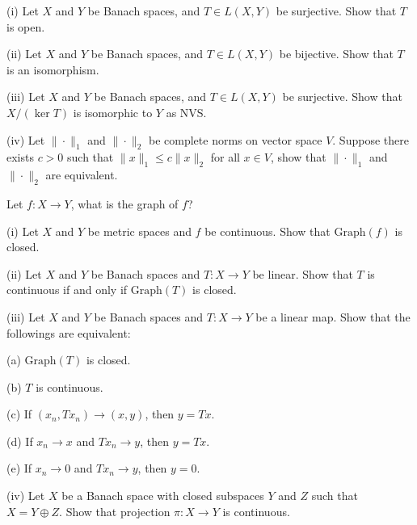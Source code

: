 \documentclass[12pt]{article}
\newcommand{\graph}{\text{Graph}}
\newenvironment{question}[2][Question]{\begin{trivlist}
\item[\hskip \labelsep {\bfseries #1}\hskip \labelsep {\bfseries #2.}]}{\end{trivlist}}
\begin{document}
\begin{question}{2.3(Open Mapping Theorem)}
	(i) Let $X$ and $Y$ be Banach spaces, and $T\in L(X,Y)$ be surjective. Show that $T$ is open.

	(ii) Let $X$ and $Y$ be Banach spaces, and $T\in L(X,Y)$ be bijective. Show that $T$ is an isomorphism.
	
	(iii) Let $X$ and $Y$ be Banach spaces, and $T \in L(X,Y)$ be surjective. Show that $X/(\ker T)$ is isomorphic to $Y$ as NVS.
	
	(iv) Let $\|\cdot\|_1$ and $\|\cdot\|_2$ be complete norms on vector space $V$. Suppose there exists $c > 0$ such that $\|x\|_1 \leq c\|x\|_2$ for all $x \in V$, show that $\|\cdot\|_1$ and $\|\cdot\|_2$ are equivalent.
\end{question}

\begin{question}{2.4(Closed Graph Theorem)}
	Let $f:X\rightarrow Y$, what is the graph of $f$?
	
	(i) Let $X$ and $Y$ be metric spaces and $f$ be continuous. Show that $\graph(f)$ is closed.
	
	(ii) Let $X$ and $Y$ be Banach spaces and $T:X\rightarrow Y$ be linear. Show that $T$ is continuous if and only if $\graph(T)$ is closed.
	
	\bigskip
	
	(iii) Let $X$ and $Y$ be Banach spaces and $T:X\rightarrow Y$ be a linear map. Show that the followings are equivalent:
	
	(a) $\graph(T)$ is closed.
	
	(b) $T$ is continuous.
	
	(c) If $(x_n,Tx_n)\rightarrow (x,y)$, then $y = Tx$.
	
	(d) If $x_n \rightarrow x$ and $Tx_n \rightarrow y$, then $y = Tx$.
	
	(e) If $x_n \rightarrow 0$ and $Tx_n \rightarrow y$, then $y = 0$.
	
	\bigskip
	
	(iv) Let $X$ be a Banach space with closed subspaces $Y$ and $Z$ such that $X = Y \oplus Z$. Show that projection $\pi: X \rightarrow Y$ is continuous.
\end{question}
\end{document}
